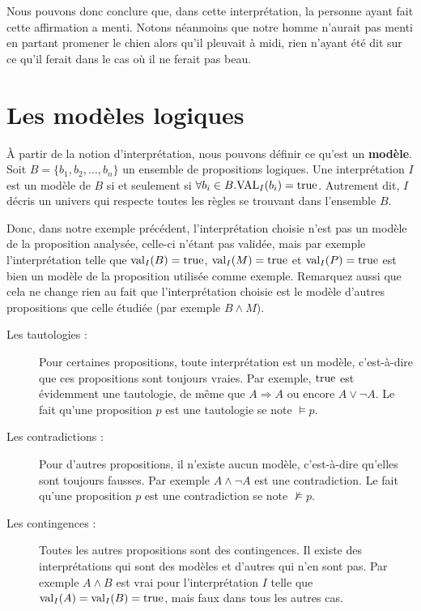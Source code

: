 Nous pouvons donc conclure que, dans cette interprétation, la personne ayant
fait cette affirmation a menti. Notons néanmoins que notre homme n'aurait pas
menti en partant promener le chien alors qu'il pleuvait à midi, rien n'ayant
été dit sur ce qu'il ferait dans le cas où il ne ferait pas beau.


\section{Les modèles logiques}

À partir de la notion d’interprétation, nous pouvons définir ce qu’est
un \textbf{modèle}. Soit $B = \{b_1, b_2, \dots, b_n \}$ un ensemble de
propositions logiques. Une interprétation $I$ est un modèle de $B$ si et
seulement si $\forall b_i \in B. \mathrm{VAL}_I(b_i) = \mathrm{true}$. Autrement dit, $I$
décris un univers qui respecte toutes les règles se trouvant dans l’ensemble
$B$.

Donc, dans notre exemple précédent, l’interprétation choisie n’est pas un modèle
de la proposition analysée, celle-ci n’étant pas validée, mais par exemple
l’interprétation telle que $\mathrm{val}_I(B) = \mathrm{true}$, $\mathrm{val}_I(M) = \mathrm{true}$ et
$\mathrm{val}_I(P) = \mathrm{true}$ est bien un modèle de la proposition utilisée comme
exemple. Remarquez aussi que cela ne change rien au fait que l’interprétation
choisie est le modèle d’autres propositions que celle étudiée (par exemple $B
\land M$).

\begin{description}\item[Les tautologies :] Pour certaines propositions, toute interprétation est un modèle, c’est-à-dire que ces propositions sont toujours
  vraies. Par exemple, $\mathrm{true}$ est évidemment une tautologie, de même que $A
  \Rightarrow A$ ou encore $A \lor \lnot A$. Le fait qu’une proposition $p$ est
  une tautologie se note $\vDash p$.
\item[Les contradictions :] Pour d’autres propositions, il n’existe aucun
  modèle, c’est-à-dire qu’elles sont toujours fausses. Par exemple $A \land
  \lnot A$ est une contradiction. Le fait qu’une proposition $p$ est une
  contradiction se note $\nvDash p$.
\item[Les contingences :] Toutes les autres propositions sont des contingences. Il
  existe des interprétations qui sont des modèles et d’autres qui n’en sont
  pas. Par exemple $A \land B$ est vrai pour l’interprétation $I$ telle que
  $\mathrm{val}_I(A) = \mathrm{val}_I(B) = \mathrm{true}$, mais faux dans tous les autres cas.
\end{description}


